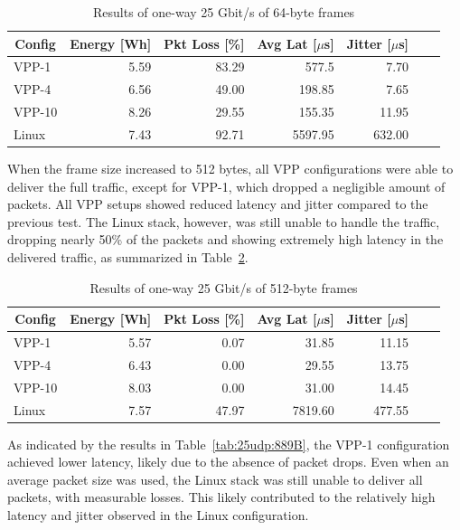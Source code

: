 \begin{table}[h!]
\centering
\caption{Results of one-way 25 Gbit/s of 64-byte frames}
\begin{tabular}{|l|r|r|r|r|r|r|}
\hline
\multicolumn{1}{|c|}{\textbf{Config}} &
\multicolumn{1}{c|}{\textbf{Energy [Wh] }} &
\multicolumn{1}{c|}{\textbf{Pkt Loss [\%]}} &
\multicolumn{1}{c|}{\textbf{Avg Lat [$\mu$s]}} &
\multicolumn{1}{c|}{\textbf{Jitter [$\mu$s]}} \\
\hline 
VPP-1 & 5.59 & 83.29 & 577.5 & 7.70 \\
VPP-4 & 6.56 & 49.00 & 198.85 & 7.65 \\
VPP-10 & 8.26 & 29.55 & 155.35 & 11.95 \\
Linux & 7.43 & 92.71 & 5597.95 & 632.00 \\
\hline
\end{tabular}
\label{tab:25udp:64B}
\end{table}

When the frame size increased to 512 bytes, all VPP configurations were able to deliver the full traffic,
except for VPP-1, which dropped a negligible amount of packets.
All VPP setups showed reduced latency and jitter compared to the previous test.
The Linux stack, however, was still unable to handle the traffic, dropping nearly 50\% of the packets and showing extremely high latency in the delivered traffic,
as summarized in Table~\ref{tab:25udp:512B}.

\begin{table}[h!]
\centering
\caption{Results of one-way 25 Gbit/s of 512-byte frames}
\begin{tabular}{|l|r|r|r|r|r|r|}
\hline
\multicolumn{1}{|c|}{\textbf{Config}} &
\multicolumn{1}{c|}{\textbf{Energy [Wh] }} &
\multicolumn{1}{c|}{\textbf{Pkt Loss [\%]}} &
\multicolumn{1}{c|}{\textbf{Avg Lat [$\mu$s]}} &
\multicolumn{1}{c|}{\textbf{Jitter [$\mu$s]}} \\
\hline 
VPP-1 & 5.57 & 0.07 & 31.85 & 11.15 \\
VPP-4 & 6.43 & 0.00 & 29.55 & 13.75 \\
VPP-10 & 8.03 & 0.00 & 31.00 & 14.45 \\
Linux & 7.57 & 47.97 & 7819.60 & 477.55 \\
\hline
\end{tabular}
\label{tab:25udp:512B}
\end{table}

As indicated by the results in Table~\ref{tab:25udp:889B}, the VPP-1 configuration achieved lower latency, likely due to the absence of packet drops.
Even when an average packet size was used, the Linux stack was still unable to deliver all packets, with measurable losses.
This likely contributed to the relatively high latency and jitter observed in the Linux configuration.

